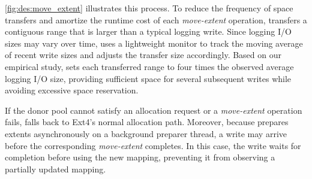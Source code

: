 \autoref{fig:des:move_extent} illustrates this process.
To reduce the frequency of space transfers and amortize the runtime cost of each \emph{move-extent} operation, \odes transfers a contiguous range that is larger than a typical logging write. Since logging I/O sizes may vary over time, \odes uses a lightweight monitor to track the moving average of recent write sizes and adjusts the transfer size accordingly. Based on our empirical study, \odes sets each transferred range to four times the observed average logging I/O size, providing sufficient space for several subsequent writes while avoiding excessive space reservation.

If the donor pool cannot satisfy an allocation request or a \emph{move-extent} operation fails, \odes falls back to Ext4's normal allocation path. Moreover, because \odes prepares extents asynchronously
on a background preparer thread, a write may arrive before the corresponding
\emph{move-extent} completes. In this case, the write waits for completion
before using the new mapping, preventing it from observing a partially
updated mapping.


